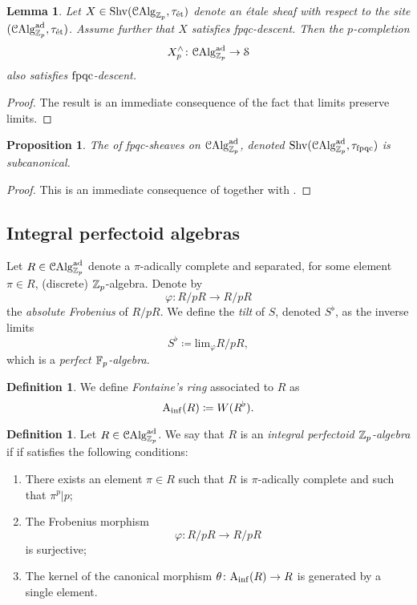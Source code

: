 \documentclass[10pt,a4paper]{amsart}
\numberwithin{equation}{subsection}
\newtheorem{lemma}[theorem]{Lemma}
\newtheorem{proposition}[theorem]{Proposition}
\theoremstyle{definition}
\newtheorem{definition}[theorem]{Definition}
\def\lim{\mathrm{lim}}
\begin{document}
\begin{lemma}
    Let $X \in \mathrm{Shv}(\mathcal{C}\mathrm{Alg}_{\mathbb Z_p}, \tau_{\text{\'et}})$ denote an \'etale sheaf with respect to the site $(\mathcal C \mathrm{Alg}^{\mathrm{ad}}_{\mathbb Z_p}, \tau_{\text{\'et}})$. Assume further that $X$ satisfies \emph{fpqc}-descent. Then the $p$-completion
        \[
                X^\wedge_p \colon \mathcal C \mathrm{Alg}^{\mathrm{ad}}_{\mathbb Z_p} \to \mathcal S  
        \]
    also satisfies $\mathrm{fpqc}$-descent.
\end{lemma}

\begin{proof}
    The result is an immediate consequence of the fact that limits preserve limits. 
\end{proof}

\begin{proposition}
    The \infcat of fpqc-sheaves on $\mathcal C \mathrm{Alg}^{\mathrm{ad}}_{\mathbb Z_p}$, denoted $\mathrm{Shv}(\mathcal C \mathrm{Alg}^{\mathrm{ad}}_{\mathbb Z_p}, \tau_{\mathrm{fpqc}})$ is subcanonical.
\end{proposition}

\begin{proof}
    This is an immediate consequence of \cite[Theorem 5.15]{Lurie_Spectral_Schemes} together with \cite[Proposition 8.1.2.1]{lurie2016spectral}.
\end{proof}
\subsection{Integral perfectoid algebras}

Let $R \in \mathcal C \mathrm{Alg}^{\mathrm{ad}}_{\mathbb Z_p}$ denote a $\pi$-adically complete and separated, for some element $\pi \in R$, (discrete) $\mathbb Z_p$-algebra. Denote by
    \[
        \varphi \colon R/ pR \to R/p  R
    \]
the \emph{absolute Frobenius} of $R/pR$. We define the \emph{tilt} of $S$, denoted $S^\flat$, as the inverse limits
    \[
        S^\flat \coloneqq \lim_{\varphi} R/ pR, 
    \]
which is a \emph{perfect $\mathbb F_p$-algebra.}

\begin{definition}
    We define \emph{Fontaine's ring} associated to $R$ as
        \[
                \mathrm{A}_{\mathrm{inf}}(R) \coloneqq W(R^\flat).
        \]
\end{definition}


\begin{definition}
Let $R \in \mathcal C \mathrm{Alg}^{\mathrm{ad}}_{\mathbb Z_p}$. We say that $R$ is an \emph{integral perfectoid $\mathbb Z_p$-algebra} if if satisfies the following conditions:
    \begin{enumerate}
            \item There exists an element $\pi \in R$ such that $R$ is $\pi$-adically complete and such that $\pi^p \vert p$;
            \item The Frobenius morphism    
                        \[
                                \varphi \colon R/p R \to R/ pR
                        \]  
                  is surjective;
            \item The kernel of the canonical morphism $\theta \colon \mathrm{A}_{\mathrm{inf}}(R) \to R$ is generated by a single element.
    \end{enumerate}
\end{definition}
\end{document}
